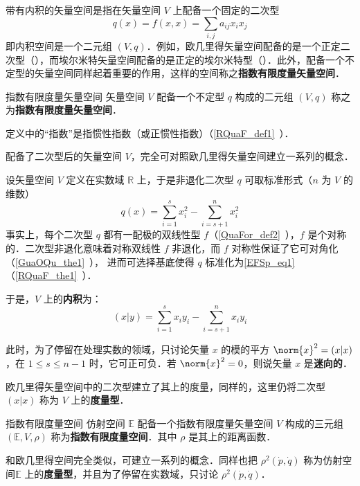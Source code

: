 
\begin{issues}
\issueDraft
\end{issues}

带有内积的矢量空间是指在矢量空间 $V$ 上配备一个固定的二次型
\begin{equation}
q(x)=f(x,x)=\sum_{i,j}a_{ij}x_ix_j
\end{equation}
 即内积空间是一个二元组 $(V,q)$．例如，欧几里得矢量空间配备的是一个正定二次型（），而埃尔米特矢量空间配备的是正定的埃尔米特型（）．此外，配备一个不定型的矢量空间同样起着重要的作用，这样的空间称之\textbf{指数有限度量矢量空间}．

 \begin{definition}{指数有限度量矢量空间}
 矢量空间 $V$ 配备一个不定型 $q$ 构成的二元组 $(V,q)$ 称之为\textbf{指数有限度量矢量空间}．
 \end{definition}
定义中的“指数”是指惯性指数（或正惯性指数）（\autoref{RQuaF_def1}~）．

配备了二次型后的矢量空间 $V$，完全可对照欧几里得矢量空间建立一系列的概念．

设矢量空间 $V$ 定义在实数域 $\mathbb R$ 上，于是非退化二次型 $q$ 可取标准形式（$n$ 为 $V$ 的维数）
\begin{equation}\label{EFSp_eq1}
q(x)=\sum_{i=1}^s x_i^2-\sum_{i=s+1}^n x_i^2
\end{equation}
事实上，每个二次型 $q$ 都有一配极的双线性型 $f$（\autoref{QuaFor_def2}~），$f$ 是个对称的．二次型非退化意味着对称双线性 $f$ 非退化，而 $f$ 对称性保证了它可对角化（\autoref{GuaOQu_the1}~）， 进而可选择基底使得 $q$ 标准化为\autoref{EFSp_eq1} （\autoref{RQuaF_the1}~）．

于是，$V$ 上的\textbf{内积}为：
\begin{equation}
(x|y)=\sum_{i=1}^{s}x_iy_i-\sum_{i=s+1}^{n}x_{i}y_i
\end{equation}

此时，为了停留在处理实数的领域，只讨论矢量 $x$ 的模的平方 $\norm{x}^2=(x|x)$，在 $1\leq s\leq n-1$ 时，它可正可负．若 $\norm{x}^2=0$，则说矢量 $x$ 是\textbf{迷向的}．

欧几里得矢量空间中的二次型建立了其上的度量，同样的，这里仍将二次型 $(x|x)$ 称为 $V$ 上的\textbf{度量型}．
\begin{definition}{指数有限度量空间}
 仿射空间 $\mathbb E$ 配备一个指数有限度量矢量空间 $V$ 构成的三元组 $(\mathbb E,V,\rho)$ 称为\textbf{指数有限度量空间}．其中 $\rho$ 是其上的距离函数．
 \end{definition}
 和欧几里得空间完全类似，可建立一系列的概念．同样也把 $\rho^2(\dot p,\dot q)$ 称为仿射空间$\mathbb E$ 上的\textbf{度量型}，并且为了停留在实数域，只讨论 $\rho^2(\dot p,\dot q)$．

